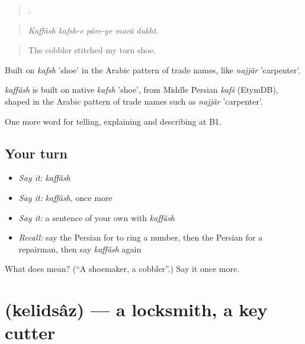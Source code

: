 \begin{quote}
    .
\end{quote}

\begin{quote}
\emph{Kaffâsh kafsh-e pâre-ye marâ dukht.}
\end{quote}

\begin{quote}
The cobbler stitched my torn shoe.
\end{quote}

Built on \emph{kafsh} 'shoe' in the Arabic pattern of trade names, like \emph{najjâr} 'carpenter'.

\begin{cousinweb}
\emph{kaffâsh} is built on native \emph{kafsh} 'shoe', from Middle Persian \emph{kafš} (EtymDB), shaped in the Arabic pattern of trade names such as \emph{najjâr} 'carpenter'.
\end{cousinweb}

\begin{grammarlens}[title={What you've built}]
One more word for telling, explaining and describing at B1.
\end{grammarlens}

\subsection*{Your turn}
\begin{itemize}
\raggedright
  \item \emph{Say it:} \emph{kaffâsh}
  \item \emph{Say it:} \emph{kaffâsh}, once more
  \item \emph{Say it:} a sentence of your own with \emph{kaffâsh}
  \item \emph{Recall:} say the Persian for to ring a number, then the Persian for a repairman, then say \emph{kaffâsh} again
\end{itemize}

\begin{tcolorbox}[breakable,colback=teal!4,colframe=teal!35!black,title={Before you move on}]
What does  mean? (\textquotedblleft{}A shoemaker, a cobbler\textquotedblright{}.) Say it once more.
\end{tcolorbox}
\section[\texorpdfstring{\fa{کلید} \fa{ساز} (kelidsâz)}{کلید ساز (kelidsâz)}]{  (kelidsâz) — a locksmith, a key cutter}

